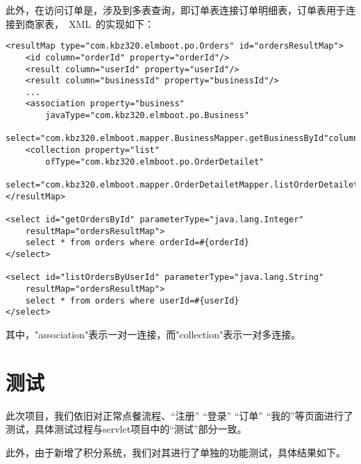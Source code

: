 此外，在访问订单是，涉及到多表查询，即订单表连接订单明细表，订单表用于连接到商家表，~XML~的实现如下：

\begin{lstlisting}[basicstyle=\footnotesize]
<resultMap type="com.kbz320.elmboot.po.Orders" id="ordersResultMap">
    <id column="orderId" property="orderId"/>
    <result column="userId" property="userId"/>
    <result column="businessId" property="businessId"/>
    ...
    <association property="business"
        javaType="com.kbz320.elmboot.po.Business"
        select="com.kbz320.elmboot.mapper.BusinessMapper.getBusinessById"column="businessId"/>
    <collection property="list"
        ofType="com.kbz320.elmboot.po.OrderDetailet"
        select="com.kbz320.elmboot.mapper.OrderDetailetMapper.listOrderDetailetByOrderId"column="orderId"/>
</resultMap>

<select id="getOrdersById" parameterType="java.lang.Integer"
    resultMap="ordersResultMap">
    select * from orders where orderId=#{orderId}
</select>

<select id="listOrdersByUserId" parameterType="java.lang.String"
    resultMap="ordersResultMap">
    select * from orders where userId=#{userId}
</select>
\end{lstlisting}

其中，"association"表示一对一连接，而"collection"表示一对多连接。

\section{测试}
此次项目，我们依旧对正常点餐流程、“注册” “登录” “订单” “我的”等页面进行了测试，具体测试过程与servlet项目中的“测试”部分一致。

此外，由于新增了积分系统，我们对其进行了单独的功能测试，具体结果如下。~\\
